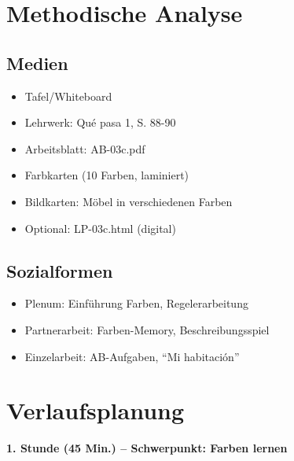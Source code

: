 \documentclass[11pt,a4paper]{article}
\newcommand{\lehrwerk}{Qué pasa 1}
\newcommand{\lehrwerkseite}{S. 88-90}
\begin{document}
\section{Methodische Analyse}

\subsection{Medien}
\begin{itemize}
    \item Tafel/Whiteboard
    \item Lehrwerk: \lehrwerk, \lehrwerkseite
    \item Arbeitsblatt: AB-03c.pdf
    \item Farbkarten (10 Farben, laminiert)
    \item Bildkarten: Möbel in verschiedenen Farben
    \item Optional: LP-03c.html (digital)
\end{itemize}

\subsection{Sozialformen}
\begin{itemize}
    \item Plenum: Einführung Farben, Regelerarbeitung
    \item Partnerarbeit: Farben-Memory, Beschreibungsspiel
    \item Einzelarbeit: AB-Aufgaben, ``Mi habitación''
\end{itemize}

\section{Verlaufsplanung}

\textbf{1. Stunde (45 Min.) -- Schwerpunkt: Farben lernen}
\end{document}

